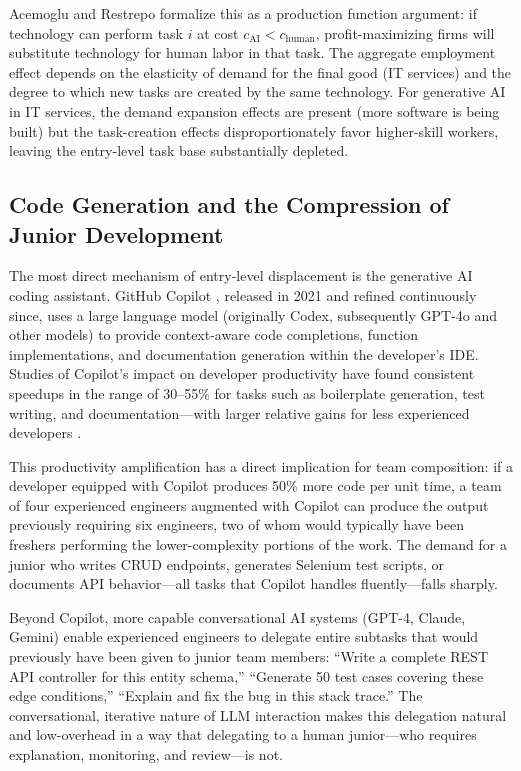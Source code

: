 \documentclass[conference]{IEEEtran}
\begin{document}
Acemoglu and Restrepo \cite{acemoglu2022tasks} formalize this as a production function argument: if technology can perform task $i$ at cost $c_{\text{AI}} < c_{\text{human}}$, profit-maximizing firms will substitute technology for human labor in that task. The aggregate employment effect depends on the elasticity of demand for the final good (IT services) and the degree to which new tasks are created by the same technology. For generative AI in IT services, the demand expansion effects are present (more software is being built) but the task-creation effects disproportionately favor higher-skill workers, leaving the entry-level task base substantially depleted.

\subsection{Code Generation and the Compression of Junior Development}

The most direct mechanism of entry-level displacement is the generative AI coding assistant. GitHub Copilot \cite{githubcopilot2023}, released in 2021 and refined continuously since, uses a large language model (originally Codex, subsequently GPT-4o and other models) to provide context-aware code completions, function implementations, and documentation generation within the developer's IDE. Studies of Copilot's impact on developer productivity have found consistent speedups in the range of 30--55\% for tasks such as boilerplate generation, test writing, and documentation---with larger relative gains for less experienced developers \cite{peng2023impact}.

This productivity amplification has a direct implication for team composition: if a developer equipped with Copilot produces 50\% more code per unit time, a team of four experienced engineers augmented with Copilot can produce the output previously requiring six engineers, two of whom would typically have been freshers performing the lower-complexity portions of the work. The demand for a junior who writes CRUD endpoints, generates Selenium test scripts, or documents API behavior---all tasks that Copilot handles fluently---falls sharply.

Beyond Copilot, more capable conversational AI systems (GPT-4, Claude, Gemini) enable experienced engineers to delegate entire subtasks that would previously have been given to junior team members: ``Write a complete REST API controller for this entity schema,'' ``Generate 50 test cases covering these edge conditions,'' ``Explain and fix the bug in this stack trace.'' The conversational, iterative nature of LLM interaction makes this delegation natural and low-overhead in a way that delegating to a human junior---who requires explanation, monitoring, and review---is not.
\end{document}
